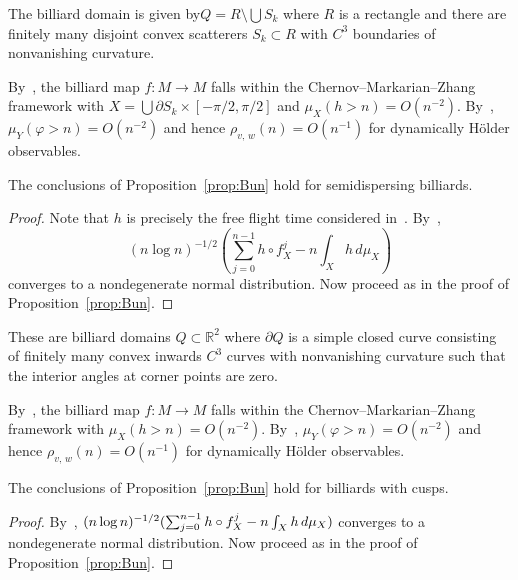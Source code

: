 \documentclass[AHL,Unicode,longabstracts,published]{cedram}
\newcommand{\R}{\mathbb{R}}
\begin{document}
\begin{exam}\label{ex:semi}
The billiard domain is given by\linebreak$Q=R\setminus\bigcup S_k$ where $R$ is a rectangle and there are finitely many disjoint convex scatterers $S_k\subset R$ with $C^3$ boundaries of nonvanishing curvature.

By~\cite[Theorem~1]{ChernovZhang05}, the billiard map $f:M\to M$ falls within the Chernov--Markarian--Zhang framework with $X=\bigcup\partial S_k\times[-\pi/2,\pi/2]$ and $\mu_X(h>n)=O(n^{-2})$. By~\cite[Theorem~1.1]{ChernovZhang08}, $\mu_Y(\varphi>n)=O(n^{-2})$ and hence $\rho_{v,\,w}(n)=O(n^{-1})$ for dynamically H\"older observables.
\end{exam}



\begin{prop}\label{prop:semi}
The conclusions of Proposition~\ref{prop:Bun} hold for semidispersing billiards.
\end{prop}

\begin{proof}
Note that $h$ is precisely the free flight time considered in~\cite{Bleher92,SzaszVarju07}. By~\cite[Theorem~1]{SzaszVarju07},
\[
(n\log n)^{-1/2}\left(\sum_{j=0}^{n-1}h\circ f_X^j-n\int_X h\,d\mu_X\right)
\]
converges to a nondegenerate normal distribution. Now proceed as in the proof of Proposition~\ref{prop:Bun}.
\end{proof}

\begin{exam}
These are billiard domains $Q\subset\R^2$ where $\partial Q$ is a simple closed curve consisting of finitely many convex inwards $C^3$ curves with nonvanishing curvature such that the interior angles at corner points are zero.

By~\cite[Theorem~1.1]{ChernovMarkarian07}, the billiard map $f:M\to M$ falls within the Chernov--Markarian--Zhang framework with $\mu_X(h>n)=O(n^{-2})$. By~\cite[Theorem~1.1]{ChernovZhang08}, $\mu_Y(\varphi>n)=O(n^{-2})$ and hence $\rho_{v,\,w}(n)=O(n^{-1})$ for dynamically H\"older observables.
\end{exam}

\begin{prop}\label{prop:cusp}
The conclusions of Proposition~\ref{prop:Bun} hold for billiards with cusps.
\end{prop}

\begin{proof}
By~\cite[Theorem~4 and Equation~(2.5)]{BalintChernovDolgopyat11}, $(n\log n)^{-1/2}(\sum_{j=0}^{n-1}h\circ f_X^j\linebreak-n\int_X h\,d\mu_X)$ converges to a nondegenerate normal distribution. Now proceed as in the proof of Proposition~\ref{prop:Bun}.
\end{proof}
\end{document}
